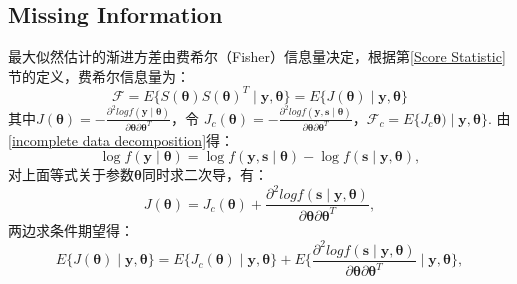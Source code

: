 \documentclass[UTF8,12pt]{ctexart}
\numberwithin{equation}{section}%
\begin{document}
	\subsection{Missing Information}
	最大似然估计的渐进方差由费希尔（Fisher）信息量决定，根据第\ref{Score Statistic}节的定义，费希尔信息量为：
	\begin{equation}\label{fisher}
		\mathcal{F}=E\{S(\boldsymbol{\theta})S(\boldsymbol{\theta})^T \mid \mathbf{y},\boldsymbol{\theta} \}=E\{J(\boldsymbol{\theta})\mid\mathbf{y}, \boldsymbol{\theta}\}
	\end{equation}
	其中$J(\boldsymbol{\theta})=-\frac{\partial^2 log f(\mathbf{y} \mid \boldsymbol{\theta})}{\partial \boldsymbol{\theta}\partial \boldsymbol{\theta}^T}$，令
	$J_c(\boldsymbol{\theta})=-\frac{\partial^2 log f(\mathbf{y}, \mathbf{s} \mid \boldsymbol{\theta})}{\partial \boldsymbol{\theta}\partial \boldsymbol{\theta}^T}$，$\mathcal{F}_c=E\{J_c\boldsymbol{\theta})\mid \mathbf{y}, \boldsymbol{\theta}\}$. 由\eqref{incomplete data decomposition}得：	
	$$
	\log f(\mathbf{y} \mid \boldsymbol{\theta}) =\log f(\mathbf{y}, \mathbf{s} \mid \boldsymbol{\theta})-\log f(\mathbf{s} \mid \mathbf{y},\boldsymbol{\theta}),	
	$$
	对上面等式关于参数$\boldsymbol{\theta}$同时求二次导，有：
	$$
		J(\boldsymbol{\theta})=J_c(\boldsymbol{\theta})+\frac{\partial^2 log f( \mathbf{s} \mid \mathbf{y},\boldsymbol{\theta})}{\partial \boldsymbol{\theta}\partial \boldsymbol{\theta}^T},
	$$
	两边求条件期望得：
	\begin{equation}\label{conditional expectation}
		E\{J(\boldsymbol{\theta}) \mid \mathbf{y}, \boldsymbol{\theta}\}=E\{J_c(\boldsymbol{\theta}) \mid \mathbf{y}, \boldsymbol{\theta}\}+E\{\frac{\partial^2 log f( \mathbf{s} \mid \mathbf{y},\boldsymbol{\theta})}{\partial \boldsymbol{\theta}\partial \boldsymbol{\theta}^T} \mid \mathbf{y}, \boldsymbol{\theta}\},	
	\end{equation}
	
\end{document}
